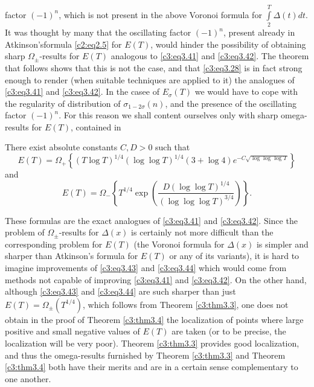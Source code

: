 factor $(-1)^n$, which is not present in the above Voronoi formula for
$\int\limits_2^{T} \Delta(t) dt$. It was thought by many that the
oscillating factor $(-1)^n$, present already in
Atkinson's\pageoriginale formula \eqref{c2:eq2.5} for $E(T)$, would
hinder the possibility of obtaining sharp $\Omega_{\pm}$-results for
$E(T)$ analogous to \eqref{c3:eq3.41} and \eqref{c3:eq3.42}. The
theorem that follows shows that this is not the case, and that
\eqref{c3:eq3.28} is in fact strong enough to render (when suitable
techniques are applied to it) the analogues of \eqref{c3:eq3.41} and
\eqref{c3:eq3.42}. In the casee of $E_\sigma(T)$ we would have to cope
with the regularity of distribution of $\sigma_{1- 2\sigma}(n)$, and
the presence of the oscillating factor $(-1)^n$. For this reason we
shall content ourselves only with sharp omega-results for $E(T)$,
contained in 

\begin{thm}\label{c3:thm3.4}
  There exist absolute constants $C, D> 0$ such that 
{\fontsize{10pt}{12pt}\selectfont
  \begin{equation}
    E(T) = \Omega_{+} \left\{(T \log T)^{1/4} (\log \log T)^{1/4} (3
    + \log 4) e^{- C\sqrt{\log \log \log T}} \right\}\label{c3:eq3.43}
  \end{equation}}
  and 
  \begin{equation}
    E(T) = \Omega_{-} \left\{T^{1/4} \exp \left(\frac{D(\log \log
      T)^{1/4}}{(\log \log \log T)^{3/4}} \right) \right\}.\label{c3:eq3.44}
  \end{equation}
\end{thm}

These formulas are the exact analogues of \eqref{c3:eq3.41} and
\eqref{c3:eq3.42}. Since the problem of $\Omega_\pm$-results for
$\Delta(x)$ is certainly not more difficult than the corresponding
problem for $E(T)$ (the Voronoi formula for $\Delta(x)$ is simpler and
sharper than Atkinson's formula for $E(T)$ or any of its variants), it
is hard to imagine improvements of \eqref{c3:eq3.43} and
\eqref{c3:eq3.44} which would come from methods not capable of
improving \eqref{c3:eq3.41} and \eqref{c3:eq3.42}. On the other hand,
although \eqref{c3:eq3.43} and \eqref{c3:eq3.44} are such sharper than
just $E(T) = \Omega_\pm (T^{1/4})$, which follows from Theorem
\ref{c3:thm3.3}, one does not obtain in the proof of Theorem
\ref{c3:thm3.4} the localization of points where large positive and
small negative values of $E(T)$ are taken (or to be precise, the
localization will be very poor). Theorem \ref{c3:thm3.3} provides good localization, and thus the omega-results furnished by Theorem \ref{c3:thm3.3} and Theorem \ref{c3:thm3.4} both have their merits and are in a certain sense complementary to one another.

